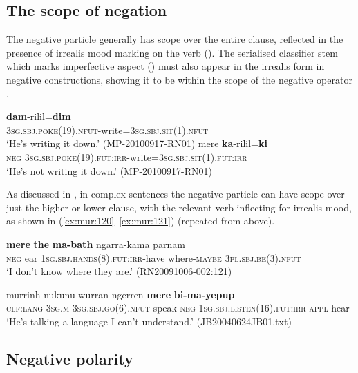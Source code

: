 \documentclass[output=paper,colorlinks,citecolor=brown]{langscibook}
\begin{document}
\subsection{The scope of negation} \label{sec:mur:4.1}

The negative particle generally has scope over the entire clause, reflected in the presence of irrealis mood marking on the verb (). The serialised classifier stem which marks imperfective aspect (\citealt{NordlingerCaudal2012}) must also appear in the irrealis form in negative constructions, showing it to be within the scope of the negative operator .

\ea\label{ex:mur:119}
    \ea\label{ex:mur:119a}
        \gll  \textbf{dam}{}-rilil=\textbf{dim}\\ 
              \textsc{3sg.sbj.poke(19).nfut-}write\textsc{=3sg.sbj.sit(1).nfut}\\
        \glt ‘He’s writing it down.’ (MP-20100917-RN01)
    \ex\label{ex:mur:119b}
        \gll  mere \textbf{ka}{}-rilil=\textbf{ki}\\
              \textsc{neg} \textsc{3sg.sbj.poke(19).fut:irr-}write\textsc{=3sg.sbj.sit(1).fut:irr}\\
        \glt ‘He’s not writing it down.’ (MP-20100917-RN01)
    \z
\z 

As discussed in , in complex sentences the negative particle can have scope over just the higher or lower clause, with the relevant verb inflecting for irrealis mood, as shown in (\ref{ex:mur:120}--\ref{ex:mur:121}) (repeated from above).

\ea\label{ex:mur:120}
    \gll \textbf{mere} \textbf{the} \textbf{ma-bath} ngarra-kama parnam\\
          \textsc{neg} ear \textsc{1sg.sbj.hands(8).fut:irr}{}-have where-\textsc{maybe} \textsc{3pl.sbj.be(3).nfut}\\
    \glt ‘I don’t know where they are.’ (RN20091006-002:121)
\z 

\ea\label{ex:mur:121}
    \gll murrinh nukunu wurran-ngerren \textbf{mere} \textbf{bi-ma-yepup}\\
        \textsc{clf:lang} \textsc{3sg.m} \textsc{3sg.sbj.go(6).nfut}{}-speak \textsc{neg} \textsc{1sg.sbj.listen(16).fut:irr-appl}{}-hear \\
    \glt ‘He’s talking a language I can't understand.’ (JB20040624JB01.txt)
\z 

\subsection{Negative polarity} \label{sec:mur:4.2}
\end{document}
